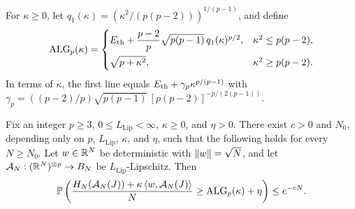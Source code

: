 For $\kappa\ge0$, let $q_1(\kappa)=(\kappa^2/(p(p-2)))^{1/(p-1)}$, and
define
\begin{equation}\label{eq:alg-field}
 \operatorname{ALG}_p(\kappa)=
 \begin{cases}
 E_{\mathrm{th}}+\dfrac{p-2}{p}\sqrt{p(p-1)}\,q_1(\kappa)^{p/2},
   &\kappa^2\le p(p-2),\\[3mm]
 \sqrt{p+\kappa^2},&\kappa^2\ge p(p-2).
 \end{cases}
\end{equation}
In terms of $\kappa$, the first line equals
$E_{\mathrm{th}}+\gamma_p\kappa^{p/(p-1)}$ with
$\gamma_p=((p-2)/p)\sqrt{p(p-1)}\,[p(p-2)]^{-p/(2(p-1))}$.

\begin{theorem}
\label{sel:published-field-threshold}
Fix an integer $p\ge3$, $0\le L_{\mathrm{Lip}}<\infty$, $\kappa\ge0$, and $\eta>0$. There exist $c>0$
and $N_0$, depending only on $p$, $L_{\mathrm{Lip}}$, $\kappa$, and $\eta$, such that
the following holds for every $N\ge N_0$. Let $w\in\mathbb R^N$ be deterministic
with $\lVert w\rVert=\sqrt N$, and let $\mathcal A_N:(\mathbb R^N)^{\otimes p}\to B_N$ be
$L_{\mathrm{Lip}}$-Lipschitz. Then
\begin{equation}\label{sel:field-threshold}
 \mathbb P\left(\frac{H_N(\mathcal A_N(J))+\kappa\left\langle w,\mathcal A_N(J)\right\rangle}N
 \ge\operatorname{ALG}_p(\kappa)+\eta\right)\le e^{-cN}.
\end{equation}
\end{theorem}


